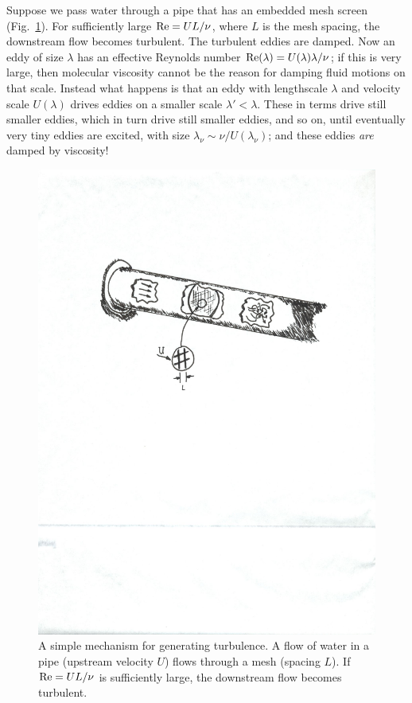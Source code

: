 Suppose we pass water through a pipe that has an embedded mesh screen (Fig.~\ref{f.turbulence}).  For sufficiently large $\mathrm{Re} = UL/\nu$, where $L$ is the mesh spacing, the downstream flow becomes turbulent. The turbulent eddies are damped.  Now an eddy of size $\lambda$ has an effective Reynolds number $\mathrm{Re}(\lambda) = U(\lambda)\lambda/\nu$; if this is very large, then molecular viscosity cannot be the reason for damping fluid motions on that scale. Instead what happens is that an eddy with lengthscale $\lambda$ and velocity scale $U(\lambda)$ drives eddies on a smaller scale $\lambda' < \lambda$. These in terms drive still smaller eddies, which in turn drive still smaller eddies, and so on, until eventually very tiny eddies are excited, with size $\lambda_{\nu} \sim \nu/U(\lambda_{\nu})$; and these eddies \emph{are} damped by viscosity!

\begin{figure}[htbp]
\includegraphics[width=\textwidth]{Figures/turbulence-maker}
\caption{\label{f.turbulence} A simple mechanism for generating turbulence. A flow of water in a pipe (upstream velocity $U$) flows through a mesh (spacing $L$).  If $\mathrm{Re} = UL/\nu$ is sufficiently large, the downstream flow becomes turbulent. }
\end{figure}

